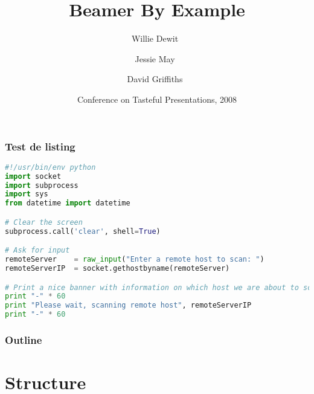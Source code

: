 \documentclass{beamer}
\title[Beamer By Example] %
{Beamer By Example}
\subtitle\definecolor{primary}{named}{regularcrimson}
\author[dfg] %
{Willie Dewit~\inst{1} \and Jessie May~\inst{2} \and David Griffiths~\inst{3}}
\institute[Universities of Somewhere and Elsewhere] %
{
  \inst{1}%
  Department of Mathematics\\
  University of Somewhere
  \and
  \inst{2}%
  Scottish Institute for Higher \TeX nology
  \and
  \inst{3}%
  University of Dundee}
\date[CTP 2007] %
{Conference on Tasteful Presentations, 2008}
\begin{document}
\begin{frame}
  \titlepage
\end{frame}

\begin{frame}[fragile]
  \frametitle{Test de listing}

\begin{lstlisting}[language=python,title=\listingstitleformat{Test de code Python}]
#!/usr/bin/env python
import socket
import subprocess
import sys
from datetime import datetime

# Clear the screen
subprocess.call('clear', shell=True)

# Ask for input
remoteServer    = raw_input("Enter a remote host to scan: ")
remoteServerIP  = socket.gethostbyname(remoteServer)

# Print a nice banner with information on which host we are about to scan
print "-" * 60
print "Please wait, scanning remote host", remoteServerIP
print "-" * 60
\end{lstlisting}

\end{frame}

\begin{frame}
  \frametitle{Outline}
  \tableofcontents[pausesections]
\end{frame}




\section{Structure}
\end{document}
